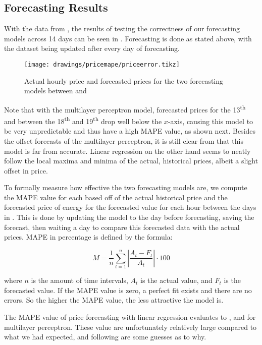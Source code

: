 \subsection{Forecasting Results}
With the data from , the results of testing the correctness of our forecasting models across 14 days can be seen in . Forecasting is done as stated above, with the dataset being updated after every day of forecasting.

\begin{figure}[!htb]
  \centering
  \texttt{[image: drawings/pricemape/priceerror.tikz]}
  \caption{Actual hourly price and forecasted prices for the two forecasting models between \protect{}  and \protect{} }\label{fig:priceerrorTest}
\end{figure}

Note that with the multilayer perceptron model, forecasted prices for the 13\textsuperscript{th} and between the 18\textsuperscript{th} and 19\textsuperscript{th} drop well below the $x$-axis, causing this model to be very unpredictable and thus have a high MAPE value, as shown next. Besides the offset forecasts of the multilayer perceptron, it is still clear from  that this model is far from accurate. Linear regression on the other hand seems to neatly follow the local maxima and minima of the actual, historical prices, albeit a slight offset in price.

To formally measure how effective the two forecasting models are, we compute the MAPE value for each based off of the actual historical price and the forecasted price of energy for the forecasted value for each hour between the days in . This is done by updating the model to the day before forecasting, saving the forecast, then waiting a day to compare this forecasted data with the actual prices. MAPE in percentage is defined by the formula:

\[
	M = \frac{1}{n} \sum\limits_{t=1}^n \left\lvert\frac{A_t - F_t}{A_t}\right\rvert \cdot 100
\]

where $n$ is the amount of time intervals, $A_t$ is the actual value, and $F_t$ is the forecasted value. If the MAPE value is zero, a perfect fit exists and there are no errors. So the higher the MAPE value, the less attractive the model is.

The MAPE value of price forecasting with linear regression evaluates to , and  for multilayer perceptron. These value are unfortunately relatively large compared to what we had expected, and following are some guesses as to why.

